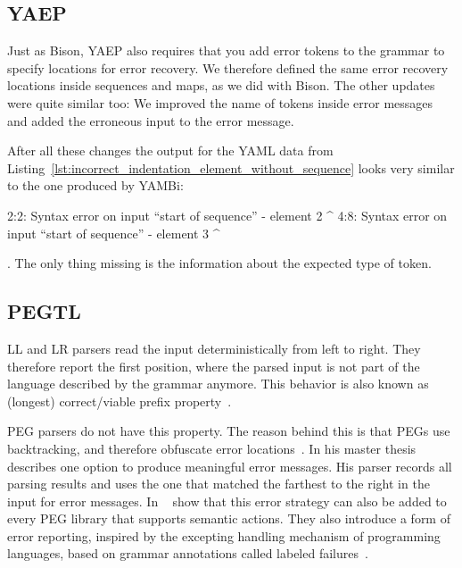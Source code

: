 \subsection{YAEP}

Just as Bison, YAEP also requires that you add error tokens to the grammar to specify locations for error recovery. We therefore defined the same error recovery locations inside sequences and maps, as we did with Bison. The other updates were quite similar too: We improved the name of tokens inside error messages and added the erroneous input to the error message.

After all these changes the output for the YAML data from Listing~\ref{lst:incorrect_indentation_element_without_sequence} looks very similar to the one produced by YAMBi:

\begin{textcode}
2:2: Syntax error on input “start of sequence”
      - element 2
      ^
4:8: Syntax error on input “start of sequence”
            - element 3
            ^
\end{textcode}

. The only thing missing is the information about the expected type of token.

\subsection{PEGTL}

LL and LR parsers read the input deterministically from left to right. They therefore report the first position, where the parsed input is not part of the language described by the grammar anymore. This behavior is also known as (longest) correct/viable prefix property~\cite{sippu1990parsing, ruefenacht2016error, maidl2016129, pottier2016reachability}.

\Gls{PEG} parsers do not have this property. The reason behind this is that \glspl{PEG} use backtracking, and therefore obfuscate error locations~\cite{ruefenacht2016error}. In his master thesis~\cite{ford2002packrat} \citeauthor{ford2002packrat} describes one option to produce meaningful error messages. His parser records all parsing results and uses the one that matched the farthest to the right in the input for error messages. In ~\cite{maidl2016129} \citeauthor{maidl2016129} show that this error strategy can also be added to every \gls{PEG} library that supports semantic actions. They also introduce a form of error reporting, inspired by the excepting handling mechanism of programming languages, based on grammar annotations called labeled failures~\cite{maidl2016129}.

